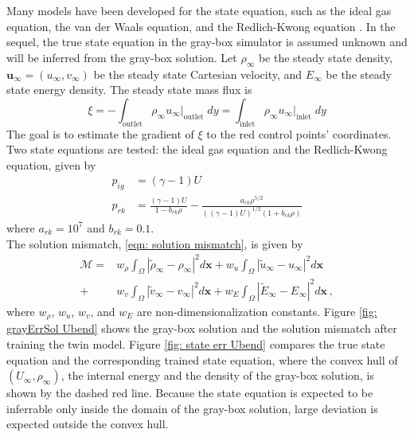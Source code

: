 Many models have been developed for the state equation, such as the ideal gas equation, the
van der Waals equation, and the Redlich-Kwong equation \cite{state eqns}.
In the sequel, the true state equation in the gray-box simulator is assumed unknown and
will be inferred from the gray-box solution. 
Let $\rho_\infty$ be the steady state density,
$\boldsymbol{u}_\infty = (u_\infty, v_\infty)$ be the steady state Cartesian velocity,
and $E_\infty$ be the steady state energy density.
The steady state mass flux is
\begin{equation}
    \xi = - \int_{\textrm{outlet}} \rho_\infty u_\infty \big|_{\textrm{outlet}} \; dy=
    \int_{\textrm{inlet}} \rho_\infty u_\infty\big|_{\textrm{inlet}} \; dy
    \label{eqn: mass flux}
\end{equation}
The goal is to estimate the gradient of $\xi$
to the red control points' coordinates.
\\

Two state equations are tested: the ideal gas equation and the Redlich-Kwong equation, 
given by \cite{aero book, Redlich Kwong}
\begin{equation}\begin{split}
    p_{ig} &= (\gamma-1) U\\
    p_{rk} &= \frac{(\gamma-1)U}{1-b_{rk}\rho} - 
    \frac{a_{rk}\rho^{5/2}}{((\gamma-1)U)^{1/2}(1+b_{rk}\rho)}
\end{split}\label{NS state equations}
\end{equation}
where $a_{rk}=10^7$ and $b_{rk}=0.1$.\\

The solution mismatch, \eqref{eqn: solution mismatch}, is given by
\begin{equation*}\begin{split}
    \mathcal{M} = &w_\rho \int_\Omega \left|\tilde{\rho}_{\infty} - \rho_{\infty}\right|^2 d\boldsymbol{x}
                + w_u
                \int_\Omega \left|\tilde{u}_{\infty}- u_{\infty}\right|^2 d\boldsymbol{x} \\
                + &w_v
                \int_\Omega \left| \tilde{v}_{\infty}- v_{\infty}\right|^2 d\boldsymbol{x}
                + w_E
                \int_\Omega \left|\tilde{E}_{\infty} - E_\infty\right|^2 d\boldsymbol{x}\,,
    \label{NS mismatch}
\end{split}\end{equation*}
where $w_\rho$, $w_u$, $w_v$, and $w_E$ are non-dimensionalization constants.
Figure \ref{fig: grayErrSol Ubend} shows the gray-box solution and the solution mismatch
after training the twin model.
Figure \ref{fig: state err Ubend} compares the true state equation and the corresponding trained 
state equation, where the convex hull of $({U}_\infty, \rho_\infty)$, the internal energy
and the density of the gray-box solution,
is shown by the dashed red line.
Because the state equation is expected to be inferrable only inside the domain of the gray-box 
solution, large deviation is expected outside the convex hull.\\

